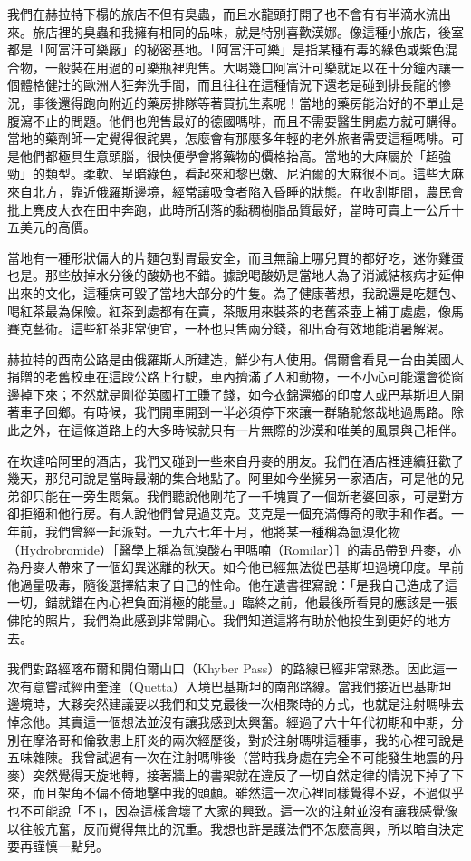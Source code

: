 我們在赫拉特下榻的旅店不但有臭蟲，而且水龍頭打開了也不會有有半滴水流出來。旅店裡的臭蟲和我擁有相同的品味，就是特別喜歡漢娜。像這種小旅店，後室都是「阿富汗可樂廠」的秘密基地。「阿富汗可樂」是指某種有毒的綠色或紫色混合物，一般裝在用過的可樂瓶裡兜售。大喝幾口阿富汗可樂就足以在十分鐘內讓一個體格健壯的歐洲人狂奔洗手間，而且往往在這種情況下還老是碰到排長龍的慘況，事後還得跑向附近的藥房排隊等著買抗生素呢！當地的藥房能治好的不單止是腹瀉不止的問題。他們也兜售最好的德國嗎啡，而且不需要醫生開處方就可購得。當地的藥劑師一定覺得很詫異，怎麼會有那麼多年輕的老外旅者需要這種嗎啡。可是他們都極具生意頭腦，很快便學會將藥物的價格抬高。當地的大麻屬於「超強勁」的類型。柔軟、呈暗綠色，看起來和黎巴嫩、尼泊爾的大麻很不同。這些大麻來自北方，靠近俄羅斯邊境，經常讓吸食者陷入昏睡的狀態。在收割期間，農民會批上麂皮大衣在田中奔跑，此時所刮落的黏稠樹脂品質最好，當時可賣上一公斤十五美元的高價。

當地有一種形狀偏大的片麵包對胃最安全，而且無論上哪兒買的都好吃，迷你雞蛋也是。那些放掉水分後的酸奶也不錯。據說喝酸奶是當地人為了消滅結核病才延伸出來的文化，這種病可毀了當地大部分的牛隻。為了健康著想，我說還是吃麵包、喝紅茶最為保險。紅茶到處都有在賣，茶販用來裝茶的老舊茶壺上補丁處處，像馬賽克藝術。這些紅茶非常便宜，一杯也只售兩分錢，卻出奇有效地能消暑解渴。

赫拉特的西南公路是由俄羅斯人所建造，鮮少有人使用。偶爾會看見一台由美國人捐贈的老舊校車在這段公路上行駛，車內擠滿了人和動物，一不小心可能還會從窗邊掉下來；不然就是剛從英國打工賺了錢，如今衣錦還鄉的印度人或巴基斯坦人開著車子回鄉。有時候，我們開車開到一半必須停下來讓一群駱駝悠哉地過馬路。除此之外，在這條道路上的大多時候就只有一片無際的沙漠和唯美的風景與己相伴。

在坎達哈阿里的酒店，我們又碰到一些來自丹麥的朋友。我們在酒店裡連續狂歡了幾天，那兒可說是當時最潮的集合地點了。阿里如今坐擁另一家酒店，可是他的兄弟卻只能在一旁生悶氣。我們聽說他剛花了一千塊買了一個新老婆回家，可是對方卻拒絕和他行房。有人說他們曾見過艾克。艾克是一個充滿傳奇的歌手和作者。一年前，我們曾經一起派對。一九六七年十月，他將某一種稱為氫溴化物（Hydrobromide）［醫學上稱為氫溴酸右甲嗎喃（Romilar）］的毒品帶到丹麥，亦為丹麥人帶來了一個幻異迷離的秋天。如今他已經無法從巴基斯坦過境印度。早前他過量吸毒，隨後選擇結束了自己的性命。他在遺書裡寫說：「是我自己造成了這一切，錯就錯在內心裡負面消極的能量。」臨終之前，他最後所看見的應該是一張佛陀的照片，我們為此感到非常開心。我們知道這將有助於他投生到更好的地方去。

我們對路經喀布爾和開伯爾山口（Khyber
Pass）的路線已經非常熟悉。因此這一次有意嘗試經由奎達（Quetta）入境巴基斯坦的南部路線。當我們接近巴基斯坦邊境時，大夥突然建議要以我們和艾克最後一次相聚時的方式，也就是注射嗎啡去悼念他。其實這一個想法並沒有讓我感到太興奮。經過了六十年代初期和中期，分別在摩洛哥和倫敦患上肝炎的兩次經歷後，對於注射嗎啡這種事，我的心裡可說是五味雜陳。我曾試過有一次在注射嗎啡後（當時我身處在完全不可能發生地震的丹麥）突然覺得天旋地轉，接著牆上的書架就在違反了一切自然定律的情況下掉了下來，而且架角不偏不倚地擊中我的頭顱。雖然這一次心裡同樣覺得不妥，不過似乎也不可能說「不」，因為這樣會壞了大家的興致。這一次的注射並沒有讓我感覺像以往般亢奮，反而覺得無比的沉重。我想也許是護法們不怎麼高興，所以暗自決定要再謹慎一點兒。

